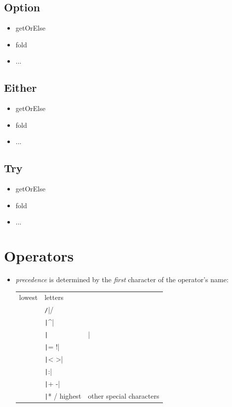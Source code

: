 \documentclass[10pt,landscape,a4paper]{article}
\begin{document}
\begin{multicols*}{4}
\subsection{Option}
\begin{itemize}
\item getOrElse
\item fold
\item ...
\end{itemize}
\subsection{Either}
\begin{itemize}
\item getOrElse
\item fold
\item ...
\end{itemize}
\subsection{Try}
\begin{itemize}
\item getOrElse
\item fold
\item ...
\end{itemize}

\section{Operators}
\begin{itemize}
\item \textit{precedence} is determined by the \textit{first} character of the
  operator's name:

  \begin{tabular}{l | l}
    lowest & letters \\
           & \texttt/|/ \\
           & \texttt|^| \\
           & \texttt|&| \\
           & \texttt|= !| \\
           & \texttt|< >| \\
           & \texttt|:| \\
           & \texttt|+ -| \\
           & \texttt|* / %
    highest & other special characters


\end{tabular}
\end{itemize}
\end{multicols*}
\end{document}
